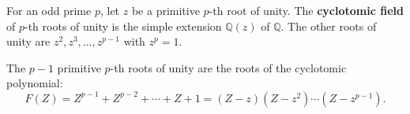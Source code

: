 For an odd prime $p$, let $z$ be a primitive $p$-th root of unity. The \textbf{cyclotomic field} of $p$-th roots of unity is the simple extension $\mathbb{Q}(z)$ of $\mathbb{Q}$. The other roots of unity are $z^2, z^3, \ldots, z^{p-1}$ with $z^p = 1$.

The $p-1$ primitive $p$-th roots of unity are the roots of the cyclotomic polynomial:
$$F(Z) = Z^{p-1} + Z^{p-2} + \cdots + Z + 1 = (Z - z)(Z - z^2) \cdots (Z - z^{p-1}).$$
